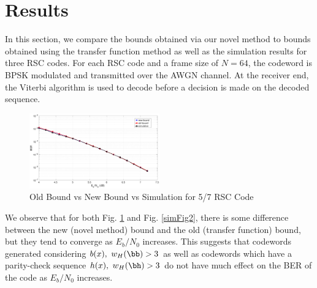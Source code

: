 \section{Results}
\label{sec6}
In this section, we compare the bounds obtained via our novel method to bounds obtained using the transfer function method as well as the simulation results for three RSC codes. For each RSC code and a frame size of $N=64$, the codeword is BPSK modulated and transmitted over the AWGN channel. At the receiver end, the Viterbi algorithm is used to decode before a decision is made on the decoded sequence.

\begin{figure}[h!]
\centering
		\includegraphics[width=0.5\textwidth]{./Images/RSC_5_7_lower_weights.eps}
		\caption{Old Bound vs New Bound vs Simulation for 5/7 RSC Code}
		\label{simFig1}
		\end{figure}
We observe that for both Fig. \ref{simFig1} and Fig. \ref{simFig2}, there is some difference between the new (novel method) bound and the old (transfer function) bound, but they tend to converge as $E_b/N_0$ increases. This suggests that codewords generated considering $b(x),~w_H(\bb)>3$ as well as codewords which have a parity-check sequence $h(x),~w_H(\bh)>3$ do not have much effect on the BER of the code as $E_b/N_0$ increases.


